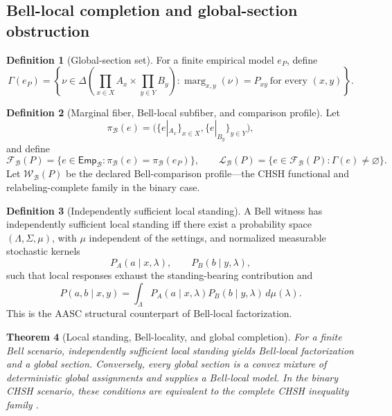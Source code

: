 \documentclass[11pt]{article}
\newtheorem{theorem}{Theorem}[section]
\theoremstyle{definition}
\newtheorem{definition}[theorem]{Definition}
\newcommand{\Bell}{\mathcal{B}}
\newcommand{\BellEmp}{\mathsf{Emp}_{\Bell}}
\newcommand{\GlobalSec}{\Gamma}
\newcommand{\Marg}{\pi_{\Bell}}
\newcommand{\BellFiber}{\mathcal F_{\Bell}}
\newcommand{\BellLocal}{\mathcal L_{\Bell}}
\newcommand{\BellWit}{\mathcal W_{\Bell}}
\begin{document}
\subsection{Bell-local completion and global-section obstruction}

\begin{definition}[Global-section set]\label{def:globalsectionset}
For a finite empirical model $e_P$, define
\[
\GlobalSec(e_P)=\left\{\nu\in\Delta\!\left(\prod_{x\in X}A_x\times\prod_{y\in Y}B_y\right):
\operatorname{marg}_{x,y}(\nu)=P_{xy}\ \text{for every }(x,y)\right\}.
\]
\end{definition}

\begin{definition}[Marginal fiber, Bell-local subfiber, and comparison profile]\label{def:marginalfiber}
Let
\[
\Marg(e)=\bigl(\{e|_{A_x}\}_{x\in X},\{e|_{B_y}\}_{y\in Y}\bigr),
\]
and define
\[
\BellFiber(P)=\{e\in\BellEmp:\Marg(e)=\Marg(e_P)\},
\qquad
\BellLocal(P)=\{e\in\BellFiber(P):\GlobalSec(e)\neq\varnothing\}.
\]
Let $\BellWit(P)$ be the declared Bell-comparison profile---the CHSH functional and relabeling-complete family in the binary case.
\end{definition}

\begin{definition}[Independently sufficient local standing]\label{def:independentlocalstanding}
A Bell witness has independently sufficient local standing iff there exist a probability space $(\Lambda,\Sigma,\mu)$, with $\mu$ independent of the settings, and normalized measurable stochastic kernels
\[
P_A(a\mid x,\lambda),\qquad P_B(b\mid y,\lambda),
\]
such that local responses exhaust the standing-bearing contribution and
\[
P(a,b\mid x,y)=\int_{\Lambda}P_A(a\mid x,\lambda)P_B(b\mid y,\lambda)\,d\mu(\lambda).
\]
This is the AASC structural counterpart of Bell-local factorization.
\end{definition}

\begin{theorem}[Local standing, Bell-locality, and global completion]\label{thm:localstandingfactorization}
For a finite Bell scenario, independently sufficient local standing yields Bell-local factorization and a global section. Conversely, every global section is a convex mixture of deterministic global assignments and supplies a Bell-local model. In the binary CHSH scenario, these conditions are equivalent to the complete CHSH inequality family \cite{Fine1982,AbramskyBrandenburger2011}.
\end{theorem}
\end{document}
